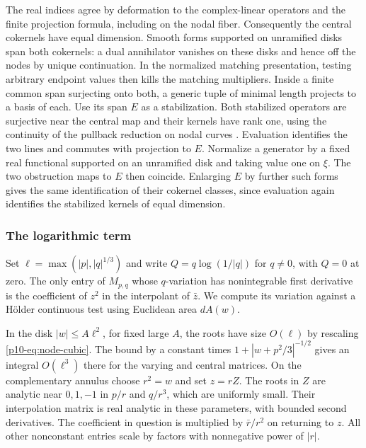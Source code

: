 The real indices agree by deformation to the complex-linear operators
and the finite projection formula, including on the nodal fiber.
Consequently the central cokernels have equal dimension. Smooth forms supported on unramified disks span both cokernels: a
dual annihilator vanishes on these disks and hence off the nodes
by unique continuation. In the normalized matching presentation,
testing arbitrary endpoint values then kills the matching multipliers.
Inside a finite common span surjecting onto both, a generic tuple of
minimal length projects to a basis of each. Use its span $E$ as a
stabilization. Both stabilized operators are surjective near the
central map and their kernels have rank one, using the continuity of
the pullback reduction on nodal curves
\cite[Appendix~B, (B.6)--(B.9)]{bai}. Evaluation identifies the two
lines and commutes with projection to $E$. Normalize a generator by a
fixed real functional supported on an unramified disk and taking value
one on $\xi$. The two obstruction maps to $E$ then coincide. Enlarging
$E$ by further such forms gives the same identification of their
cokernel classes, since evaluation again identifies the stabilized
kernels of equal dimension.

\subsubsection{The logarithmic term}

Set $\ell=\max(|p|,|q|^{1/3})$ and write $Q=q\log(1/|q|)$ for $q\ne0$,
with $Q=0$ at zero. The only entry of $M_{p,q}$ whose $q$-variation
has nonintegrable first derivative is the coefficient of $z^2$ in the
interpolant of $\bar z$. We compute its variation against a H\"older
continuous test using Euclidean area $dA(w)$.

In the disk $|w|\le A\ell^2$, for fixed large $A$, the roots have
size $O(\ell)$ by rescaling \eqref{p10-eq:node-cubic}. The bound by a
constant times $1+|w+p^2/3|^{-1/2}$ gives an integral $O(\ell^3)$
there for the varying and central matrices. On the complementary
annulus choose $r^2=w$ and set $z=rZ$. The roots in $Z$ are analytic
near $0,1,-1$ in $p/r$ and $q/r^3$, which are uniformly small. Their
interpolation matrix is real analytic in these parameters, with bounded
second derivatives. The coefficient in question is multiplied by
$\bar r/r^2$ on returning to $z$. All other nonconstant entries scale
by factors with nonnegative power of $|r|$.

